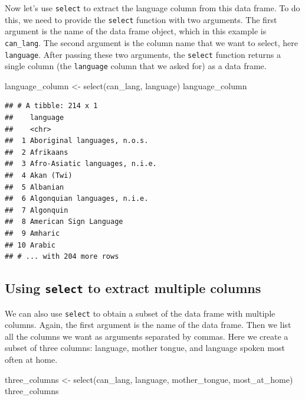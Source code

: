 \documentclass[
]{krantz}
\makeatletter
\newenvironment{Shaded}{\begin{snugshade}}{\end{snugshade}}
\newcommand{\FunctionTok}[1]{\textcolor[rgb]{0,0,0}{#1}}
\newcommand{\NormalTok}[1]{#1}
\newcommand{\OtherTok}[1]{\textcolor[rgb]{0.37,0.37,0.37}{#1}}
\newenvironment{kframe}{%
\medskip{}
\setlength{\fboxsep}{.8em}
 \def\at@end@of@kframe{}%
 \ifinner\ifhmode%
  \def\at@end@of@kframe{\end{minipage}}%
  \begin{minipage}{\columnwidth}%
 \fi\fi%
 \def\FrameCommand##1{\hskip\@totalleftmargin \hskip-\fboxsep
 \colorbox{shadecolor}{##1}\hskip-\fboxsep
     \hskip-\linewidth \hskip-\@totalleftmargin \hskip\columnwidth}%
 \MakeFramed {\advance\hsize-\width
   \@totalleftmargin\z@ \linewidth\hsize
   \@setminipage}}%
 {\par\unskip\endMakeFramed%
 \at@end@of@kframe}
\renewenvironment{Shaded}{\begin{kframe}}{\end{kframe}}
\makeatother
\begin{document}
Now let's use \texttt{select} to extract the language column from this data frame. To do this, we need to provide the \texttt{select} function with two arguments. The first argument is the
name of the data frame object, which in this example is \texttt{can\_lang}. The second argument is the column name that we want to select, here \texttt{language}. After passing these two arguments,
the \texttt{select} function returns a single column (the \texttt{language} column that we asked for) as a data frame.

\begin{Shaded}
\begin{Highlighting}[]
\NormalTok{language\_column }\OtherTok{\textless{}{-}} \FunctionTok{select}\NormalTok{(can\_lang, language)}
\NormalTok{language\_column}
\end{Highlighting}
\end{Shaded}

\begin{verbatim}
## # A tibble: 214 x 1
##    language                      
##    <chr>                         
##  1 Aboriginal languages, n.o.s.  
##  2 Afrikaans                     
##  3 Afro-Asiatic languages, n.i.e.
##  4 Akan (Twi)                    
##  5 Albanian                      
##  6 Algonquian languages, n.i.e.  
##  7 Algonquin                     
##  8 American Sign Language        
##  9 Amharic                       
## 10 Arabic                        
## # ... with 204 more rows
\end{verbatim}

\hypertarget{using-select-to-extract-multiple-columns}{%
\subsection{\texorpdfstring{Using \texttt{select} to extract multiple columns}{Using select to extract multiple columns}}\label{using-select-to-extract-multiple-columns}}

We can also use \texttt{select} to obtain a subset of the data frame with multiple columns. Again, the first argument is the name of the data frame.
Then we list all the columns we want as arguments separated by commas. Here we create a subset of three columns: language, mother tongue, and language spoken most often at home.

\begin{Shaded}
\begin{Highlighting}[]
\NormalTok{three\_columns }\OtherTok{\textless{}{-}} \FunctionTok{select}\NormalTok{(can\_lang, language, mother\_tongue, most\_at\_home)}
\NormalTok{three\_columns}
\end{Highlighting}
\end{Shaded}
\end{document}
